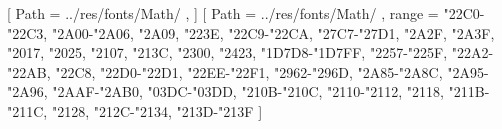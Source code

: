 [
	Path = ../res/fonts/Math/ ,
]
[
	Path = ../res/fonts/Math/ ,
	range = {"22C0-"22C3, "2A00-"2A06, "2A09, "223E, "22C9-"22CA, "27C7-"27D1, "2A2F,
			"2A3F, "2017, "2025, "2107, "213C, "2300, "2423, "1D7D8-"1D7FF, "2257-"225F,
			"22A2-"22AB, "22C8, "22D0-"22D1, "22EE-"22F1, "2962-"296D, "2A85-"2A8C, "2A95-"2A96,
			"2AAF-"2AB0, "03DC-"03DD, "210B-"210C, "2110-"2112, "2118, "211B-"211C, "2128,
			"212C-"2134, "213D-"213F}
]